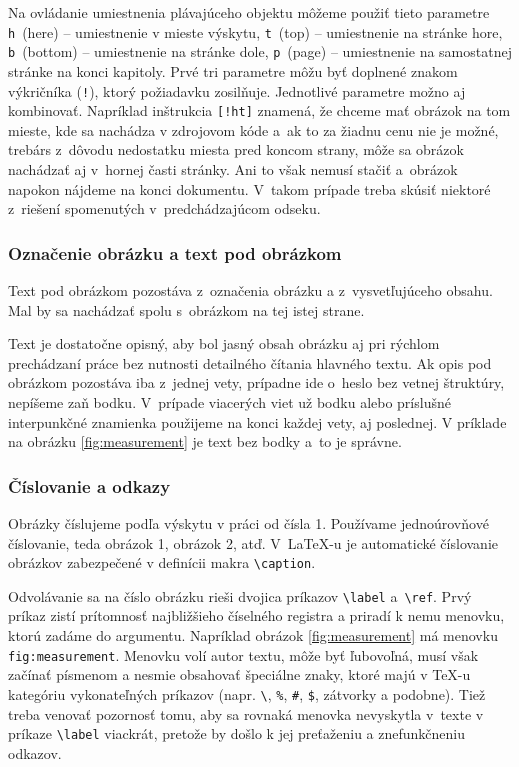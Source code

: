 Na ovládanie umiestnenia plávajúceho objektu môžeme použiť tieto
parametre \verb|h|~(here) -- umiestnenie v mieste výskytu,
\verb|t|~(top) -- umiestnenie na stránke hore, \verb|b|~(bottom) --
umiestnenie na stránke dole, \verb|p|~(page) -- umiestnenie
na samostatnej stránke na konci kapitoly. Prvé tri
parametre môžu byť doplnené znakom výkričníka (\verb|!|),
ktorý požiadavku zosilňuje.
Jednotlivé parametre možno aj kombinovať.
Napríklad inštrukcia \verb|[!ht]| znamená, že chceme mať
obrázok na tom mieste, kde sa nachádza v zdrojovom kóde
a~ak to za žiadnu cenu nie je možné,
trebárs z~dôvodu nedostatku miesta pred koncom strany,
môže sa obrázok nachádzať aj v~hornej časti stránky.
Ani to však nemusí stačiť a~obrázok napokon nájdeme
na konci dokumentu.
V~takom prípade treba skúsiť niektoré
z~riešení spomenutých v~predchádzajúcom odseku.

\subsubsection{Označenie obrázku a text pod obrázkom}
Text pod obrázkom pozostáva z~označenia obrázku a z~vysvetľujúceho obsahu.
Mal by sa nachádzať spolu s~obrázkom na tej istej strane.

Text je dostatočne opisný,
aby bol jasný obsah obrázku aj pri rýchlom prechádzaní
práce bez nutnosti detailného čítania hlavného textu.
Ak opis pod obrázkom pozostáva iba z~jednej vety,
prípadne ide o~heslo bez vetnej štruktúry,
nepíšeme zaň bodku.
V~prípade viacerých viet už bodku alebo príslušné interpunkčné
znamienka použijeme na konci každej vety,
aj poslednej.
V príklade na obrázku \ref{fig:measurement} je text bez bodky
a~to je správne.

\subsubsection{Číslovanie a odkazy}
Obrázky číslujeme podľa výskytu v práci od čísla 1.
Používame jednoúrovňové číslovanie,
teda obrázok 1, obrázok 2, atď.
V~\LaTeX-u je automatické číslovanie obrázkov zabezpečené v definícii makra \verb|\caption|.

Odvolávanie sa na číslo obrázku rieši dvojica príkazov \verb|\label| a~\verb|\ref|.
Prvý príkaz zistí prítomnosť najbližšieho číselného
registra a priradí k nemu menovku, ktorú zadáme do argumentu.
Napríklad obrázok \ref{fig:measurement} má menovku \verb|fig:measurement|. Menovku volí autor textu, môže byť ľubovoľná, musí však začínať písmenom a nesmie obsahovať špeciálne znaky, ktoré majú v \TeX-u kategóriu vykonateľných príkazov (napr. \verb|\|, \verb|%|, \verb|#|, \verb|$|, zátvorky a podobne). Tiež treba venovať pozornosť tomu, aby sa rovnaká menovka nevyskytla v~texte v príkaze \verb|\label| viackrát, pretože by došlo k jej preťaženiu a znefunkčneniu odkazov.

